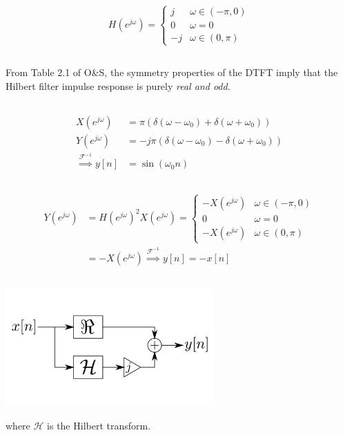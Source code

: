 \documentclass{article}
\begin{document}
\newpage
\section{}

\begin{equation}
    H(e^{j \omega}) =
    \begin{cases}
        j & \omega \in (-\pi, 0) \\
        0 & \omega = 0 \\
        -j & \omega \in (0, \pi)
    \end{cases}
\end{equation}

\subsection{}

From Table 2.1 of O\&S, the symmetry properties of the DTFT imply that the Hilbert filter impulse response is purely \emph{real and odd}.

\subsection{}

\begin{align}
    X(e^{j \omega}) &= \pi (\delta(\omega - \omega_0) + \delta(\omega + \omega_0)) \\
    Y(e^{j \omega}) &= -j \pi (\delta(\omega - \omega_0) - \delta(\omega + \omega_0)) \\
    \overset{\mathcal{F}^{-1}}{\implies} y[n] &= \sin(\omega_0 n)
\end{align}

\subsection{}

\begin{align}
    Y(e^{j \omega}) &= H(e^{j \omega})^2 X(e^{j \omega}) =
    \begin{cases}
        -X(e^{j \omega}) & \omega \in (-\pi, 0) \\
        0 & \omega = 0 \\
        -X(e^{j \omega}) & \omega \in (0, \pi)
    \end{cases} \\
    &= -X(e^{j \omega}) \overset{\mathcal{F}^{-1}}{\implies} y[n] = -x[n]
\end{align}

\subsection{}

\begin{center}
    \includegraphics[width=0.6\textwidth]{q9d.png}
\end{center}
where \(\mathcal{H}\) is the Hilbert transform.
\end{document}
